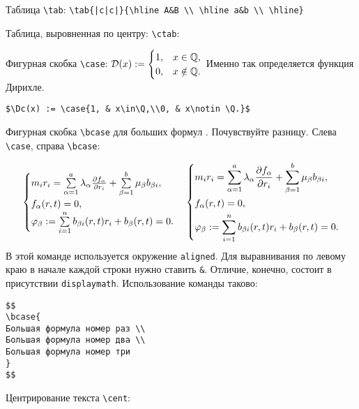 \documentclass[a4paper]{article}
\begin{document}
\begin{items}{-1}

\item Таблица \verb"\tab": 
\verb'\tab{|c|c|}{\hline A&B \\ \hline a&b \\ \hline}'

\item Таблица, выровненная по центру: \verb"\ctab": 

\item Фигурная скобка \verb"\case": $\mathcal{D}(x) := \begin{cases}1, & x\in\mathbb{Q},\\0, & x\notin \mathbb{Q}.\end{cases}$ Именно так определяется функция Дирихле.
\begin{verbatim}
$\Dc(x) := \case{1, & x\in\Q,\\0, & x\notin \Q.}$
\end{verbatim}

\item Фигурная скобка \verb"\bcase" для больших формул . Почувствуйте разницу.
Слева \verb"\case", справа \verb"\bcase":

$$
\begin{cases}
m_i r_i= \sum\limits_{{\alpha=1}}^{{a}}\lambda_{\alpha}\frac{\partial f_{\alpha}}{\partial r_i}+\sum\limits_{{\beta=1}}^{{b}}\mu_{\beta}b_{\beta i},\\
f_{\alpha}(r,t)=0,\\
\varphi_{\beta}:=\sum\limits_{{i=1}}^{{n}}b_{\beta i}(r,t)r_i+b_{\beta}(r,t)=0.
\end{cases}
\left\{\begin{aligned}
&m_i r_i = \sum\limits_{{\alpha=1}}^{{a}}\lambda_{\alpha}\frac{\partial f_{\alpha}}{\partial r_i}+\sum\limits_{{\beta=1}}^{{b}}\mu_{\beta}b_{\beta i},\\
&f_{\alpha}(r,t)=0,\\
&\varphi_{\beta}:=\sum\limits_{{i=1}}^{{n}}b_{\beta i}(r,t)r_i+b_{\beta}(r,t)=0.\end{aligned}\right.
$$
В этой команде используется окружение \texttt{aligned}. Для выравнивания по левому краю в начале каждой строки нужно ставить \texttt{\&}.
Отличие, конечно, состоит в присутствии \texttt{displaymath}.
Использование команды таково:
\begin{verbatim}
$$
\bcase{
Большая формула номер раз \\
Большая формула номер два \\
Большая формула номер три
}
$$
\end{verbatim}

\item Центрирование текста \verb"\cent": 


\end{items}
\end{document}
